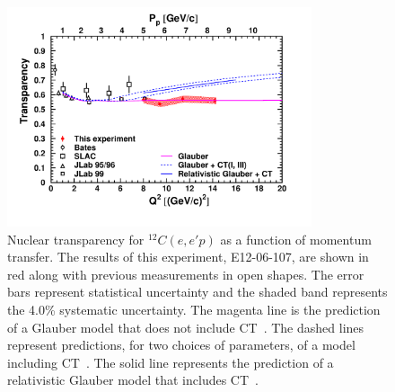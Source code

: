 \begin{figure}[!h]
    \centering
    \includegraphics[width=0.8\textwidth]{chap5/c12_results.pdf}
    \caption{
            Nuclear transparency for ${}^{12}C(e,e'p)$ as a function of
            momentum transfer.
            The results of this experiment, E12-06-107, are shown in red along
            with previous measurements in open shapes.
            The error bars represent statistical uncertainty and the
            shaded band represents the 4.0\% systematic uncertainty.
            The magenta line is the prediction of a Glauber
            model that does not include CT~\cite{Pandharipande_1992}.
            The dashed lines represent predictions, for two choices of
            parameters, of a model including CT~\cite{Frankfurt_1995}.
            The solid line represents the prediction of a relativistic Glauber
            model that includes CT~\cite{Cosyn_2006}.
            }
    \label{fig:c12_transparency_results}
\end{figure}


